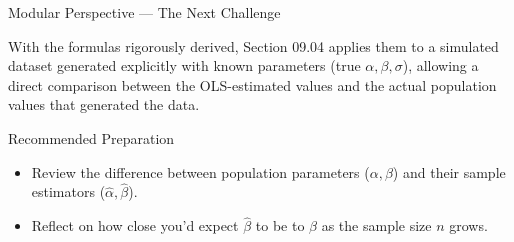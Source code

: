 \documentclass[10pt, aspectratio=169]{beamer}
\begin{document}
\begin{frame}{Modular Perspective --- The Next Challenge}
  \scriptsize
  \begin{retoclase}
    With the formulas rigorously derived, Section 09.04 applies them to a simulated dataset generated explicitly with known parameters (true $\alpha,\beta,\sigma$), allowing a direct comparison between the OLS-estimated values and the actual population values that generated the data.
  \end{retoclase}

  \vspace{0.08cm}
  \pause
  \begin{alertblock}{Recommended Preparation}
    \begin{itemize}\itemsep=0.06cm
      \item Review the difference between population parameters ($\alpha,\beta$) and their sample estimators ($\hat\alpha,\hat\beta$).
      \item Reflect on how close you'd expect $\hat\beta$ to be to $\beta$ as the sample size $n$ grows.
    \end{itemize}
  \end{alertblock}
\end{frame}
\end{document}

